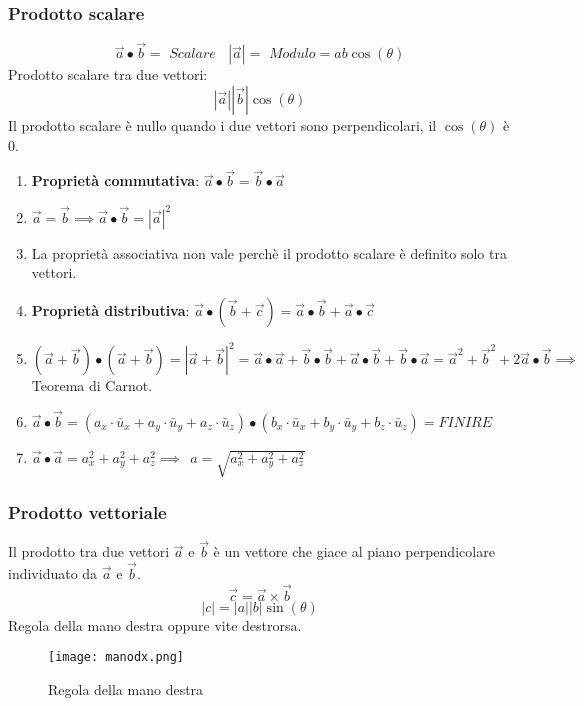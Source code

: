 \documentclass[../../main.tex]{subfiles}
\begin{document}
\subsubsection{Prodotto scalare}
\[
    \vec{a} \bullet \vec{b} = \textit{ Scalare} \ \ \ \ |\vec{a}| = \textit{ Modulo} = ab \cos(\theta)
\]
Prodotto scalare tra due vettori:
\[
    |\vec{a}||\vec{b}| \cos(\theta)
\]
Il prodotto scalare è nullo quando i due vettori sono perpendicolari, il $\cos(\theta)$ è $0$.
\begin{enumerate}
    \item \textbf{Proprietà commutativa}: $\vec{a} \bullet \vec{b} = \vec{b} \bullet \vec{a}$
    \item $\vec{a} = \vec{b} \implies \vec{a} \bullet \vec{b} = |\vec{a}|^2$
    \item La proprietà associativa non vale perchè il prodotto scalare è definito solo tra vettori.
    \item \textbf{Proprietà distributiva}: $\vec{a} \bullet (\vec{b} + \vec{c}) = \vec{a} \bullet \vec{b} + \vec{a} \bullet \vec{c}$
    \item $(\vec{a} + \vec{b}) \bullet (\vec{a} + \vec{b}) = |\vec{a} + \vec{b}|^2 = \vec{a} \bullet \vec{a} + \vec{b} \bullet \vec{b} + \vec{a} \bullet \vec{b} + \vec{b} \bullet \vec{a} = \vec{a}^2 + \vec{b}^2 + 2\vec{a} \bullet \vec{b} \implies$ Teorema di Carnot.
    \item $\vec{a} \bullet \vec{b} = (a_x \cdot \bar{u}_x + a_y \cdot \bar{u}_y + a_z \cdot \bar{u}_z) \bullet (b_x \cdot \bar{u}_x + b_y \cdot \bar{u}_y + b_z \cdot \bar{u}_z) = FINIRE$
    \item $\vec{a} \bullet \vec{a} = a_x^2 + a_y^2 + a_z^2 \implies \ \ a = \sqrt{a_x^2 + a_y^2 + a_z^2}$
\end{enumerate}
\subsubsection{Prodotto vettoriale}
Il prodotto tra due vettori $\vec{a}$ e $\vec{b}$ è un vettore che giace al piano perpendicolare individuato da $\vec{a}$ e $\vec{b}$.
\[
    \vec{c} = \vec{a} \times \vec{b}
\]
\[
    |c| = |a||b| \sin(\theta)
\]
Regola della mano destra oppure vite destrorsa.
\begin{figure}
    \centering
    \texttt{[image: manodx.png]}
    \caption{Regola della mano destra}
\end{figure}
\end{document}
